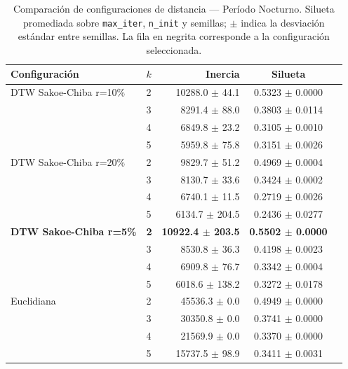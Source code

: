 

\begin{table}[ht]
  \centering
  \caption{Comparación de configuraciones de distancia — Período Nocturno. Silueta promediada sobre \texttt{max\_iter}, \texttt{n\_init} y semillas; $\pm$ indica la desviación estándar entre semillas. La fila en negrita corresponde a la configuración seleccionada.}
  \label{tab:tuning_config_nighttime}
  \begin{tabular}{llrcc}
    \toprule
    \textbf{Configuración} & \textbf{$k$} & \textbf{Inercia} & \textbf{Silueta} \\
    \midrule
    DTW Sakoe-Chiba r=10\% & 2 & 10288.0 $\pm$ 44.1 & 0.5323 $\pm$ 0.0000 \\
     & 3 & 8291.4 $\pm$ 88.0 & 0.3803 $\pm$ 0.0114 \\
     & 4 & 6849.8 $\pm$ 23.2 & 0.3105 $\pm$ 0.0010 \\
     & 5 & 5959.8 $\pm$ 75.8 & 0.3151 $\pm$ 0.0026 \\
    DTW Sakoe-Chiba r=20\% & 2 & 9829.7 $\pm$ 51.2 & 0.4969 $\pm$ 0.0004 \\
     & 3 & 8130.7 $\pm$ 33.6 & 0.3424 $\pm$ 0.0002 \\
     & 4 & 6740.1 $\pm$ 11.5 & 0.2719 $\pm$ 0.0026 \\
     & 5 & 6134.7 $\pm$ 204.5 & 0.2436 $\pm$ 0.0277 \\
    \textbf{DTW Sakoe-Chiba r=5\%} & \textbf{2} & \textbf{10922.4 $\pm$ 203.5} & \textbf{0.5502 $\pm$ 0.0000} \\
     & 3 & 8530.8 $\pm$ 36.3 & 0.4198 $\pm$ 0.0023 \\
     & 4 & 6909.8 $\pm$ 76.7 & 0.3342 $\pm$ 0.0004 \\
     & 5 & 6018.6 $\pm$ 138.2 & 0.3272 $\pm$ 0.0178 \\
    Euclidiana & 2 & 45536.3 $\pm$ 0.0 & 0.4949 $\pm$ 0.0000 \\
     & 3 & 30350.8 $\pm$ 0.0 & 0.3741 $\pm$ 0.0000 \\
     & 4 & 21569.9 $\pm$ 0.0 & 0.3370 $\pm$ 0.0000 \\
     & 5 & 15737.5 $\pm$ 98.9 & 0.3411 $\pm$ 0.0031 \\
    \bottomrule
  \end{tabular}
\end{table}

